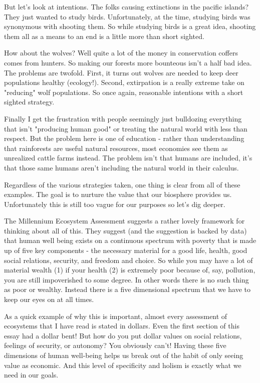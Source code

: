 \documentclass[11pt]{book}
\begin{document}
But let's look at intentions. The folks causing extinctions in the pacific islands? They just wanted to study birds. Unfortunately, at the time, studying birds was synonymous with shooting them. So while studying birds is a great idea, shooting them all as a means to an end is a little more than short sighted. 

How about the wolves? Well quite a lot of the money in conservation coffers comes from hunters. So making our forests more bounteous isn't a half bad idea. The problems are twofold. First, it turns out wolves are needed to keep deer populations healthy (ecology!). Second, extirpation is a really extreme take on "reducing" wolf populations. So once again, reasonable intentions with a short sighted strategy.

Finally I get the frustration with people seemingly just bulldozing everything that isn't "producing human good" or treating the natural world with less than respect. But the problem here is one of education - rather than understanding that rainforests are useful natural resources, most economies see them as unrealized cattle farms instead. The problem isn't that humans are included, it's that those same humans aren't including the natural world in their calculus. 

Regardless of the various strategies taken, one thing is clear from all of these examples. The goal is to nurture the value that our biosphere provides us. Unfortunately this is still too vague for our purposes so let's dig deeper.
\newline

The Millennium Ecosystem Assessment \cite{mes} suggests a rather lovely framework for thinking about all of this. They suggest (and the suggestion is backed by data) that human well being exists on a continuous spectrum with poverty that is made up of five key components - the necessary material for a good life, health, good social relations, security, and freedom and choice. So while you may have a lot of material wealth (1) if your health (2) is extremely poor because of, say, pollution, you are still impoverished to some degree. In other words there is no such thing as poor or wealthy. Instead there is a five dimensional spectrum that we have to keep our eyes on at all times. 

As a quick example of why this is important, almost every assessment of ecosystems that I have read is stated in dollars. Even the first section of this essay had a dollar bent! But how do you put dollar values on social relations, feelings of security, or autonomy? You obviously can't! Having these five dimensions of human well-being helps us break out of the habit of only seeing value as economic. And this level of specificity and holism is exactly what we need in our goals.
\newline
\end{document}

